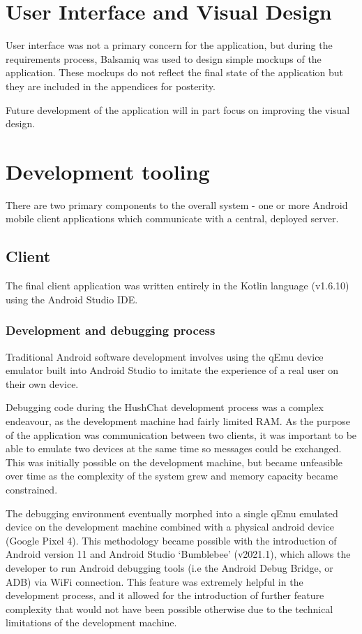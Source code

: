 \documentclass{mproj}
\begin{document}
\section{User Interface and Visual Design}
User interface was not a primary concern for the application, but during the requirements process, Balsamiq was used to design simple mockups of the application. These mockups do not reflect the final state of the application but they are included in the appendices for posterity.

Future development of the application will in part focus on improving the visual design.


\section{Development tooling}
There are two primary components to the overall system - one or more Android mobile client applications which communicate with a central, deployed server.


\subsection{Client}
The final client application was written entirely in the Kotlin language (v1.6.10) using the Android Studio IDE. 

\subsubsection{Development and debugging process}
Traditional Android software development involves using the qEmu device emulator built into Android Studio to imitate the experience of a real user on their own device. 

Debugging code during the HushChat development process was a complex endeavour, as the development machine had fairly limited RAM. As the purpose of the application was communication between two clients, it was important to be able to emulate two devices at the same time so messages could be exchanged. This was initially possible on the development machine, but became unfeasible over time as the complexity of the system grew and memory capacity became constrained. 

The debugging environment eventually morphed into a single qEmu emulated device on the development machine combined with a physical android device (Google Pixel 4). This methodology became possible with the introduction of Android version 11 and Android Studio `Bumblebee' (v2021.1), which allows the developer to run Android debugging tools (i.e the Android Debug Bridge, or ADB) via WiFi connection. This feature was extremely helpful in the development process, and it allowed for the introduction of further feature complexity that would not have been possible otherwise due to the technical limitations of the development machine. 
\end{document}
